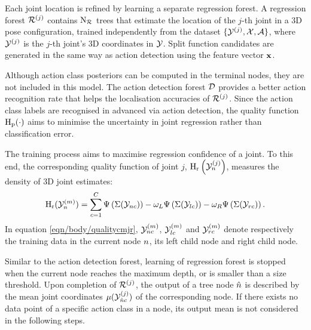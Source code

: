 Each joint location is refined by learning a separate regression forest.  
A regression forest $\mathcal{R}^{(j)}$ contains $\mathrm{N_{\mathcal{R}}}$ trees that estimate the location of the $j$-th joint in a 3D pose configuration, trained independently from the dataset $\{ \mathcal{Y}^{(j)}, \mathcal{X}, \mathcal{A}\}$, where $\mathcal{Y}^{(j)}$ is the $j$-th joint's 3D coordinates in $\mathcal{Y}$. 
Split function candidates are generated in the same way as action detection using the feature vector $\mathbf{x}$. 

Although action class posteriors can be computed in the terminal nodes, they are not included in this model. The action detection forest $\mathcal{D}$ provides a better action recognition rate that helps the localisation accuracies of $\mathcal{R}^{(j)}$. Since the action class labels are recognised in advanced via action detection, the quality function $\mathrm{H_{p}}(\cdot)$ aims to minimise the uncertainty in joint regression rather than classification error.

The training process aims to maximise regression confidence of a joint. To this end, the corresponding quality function of joint $j$, $\mathrm{H_{r}}\left(\mathcal{Y}^{(j)}_{n}\right)$, measures the density of 3D joint estimates: 
\begin{equation}
	\label{eqn/body/qualitycmjr}
	\mathrm{H_{r}}(\mathcal{Y}^{(m)}_{n}) = \displaystyle\sum_{c = 1}^{C} \Psi\left(\Sigma(\mathcal{Y}_{n c})\right) - \omega_{L}\Psi\left(\Sigma(\mathcal{Y}_{lc})\right) - \omega_{R}\Psi\left(\Sigma(\mathcal{Y}_{rc})\right).
\end{equation}
In equation \ref{eqn/body/qualitycmjr}, $\mathcal{Y}^{(m)}_{n c}$, $\mathcal{Y}^{(m)}_{l c}$ and $\mathcal{Y}^{(m)}_{r c}$ denote respectively the training data in the current node $n$, its left child node and right child node.  

Similar to the action detection forest, learning of regression forest is stopped when the current node reaches the maximum depth, or is smaller than a size threshold.  
Upon completion of $\mathcal{R}^{(j)}$, the output of a tree node ${\hat{n}}$ is described by the mean joint coordinates $\mu(\mathcal{Y}^{(j)}_{{\hat{n}} c})$ of the corresponding node. If there exists no data point of a specific action class in a node, its output mean is not considered in the following steps. 

